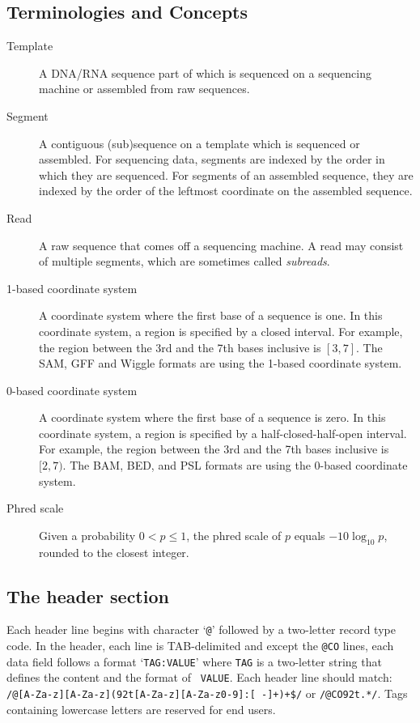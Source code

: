 \documentclass[10pt]{article}
\begin{document}
\pagebreak

\subsection{Terminologies and Concepts}

\begin{description}
\item[Template] A DNA/RNA sequence part of which is sequenced on a
  sequencing machine or assembled from raw sequences.
\item[Segment] A contiguous (sub)sequence on a template which is
  sequenced or assembled. For sequencing data, segments are indexed by
  the order in which they are sequenced. For segments of an assembled
  sequence, they are indexed by the order of the leftmost coordinate on
  the assembled sequence.
\item[Read] A raw sequence that comes off a sequencing machine. A read
  may consist of multiple segments, which are sometimes called \emph{subreads}.
\item[1-based coordinate system] A coordinate system where the first
  base of a sequence is one. In this coordinate system, a region is
  specified by a closed interval. For example, the region between the
  3rd and the 7th bases inclusive is $[3,7]$. The SAM, GFF and Wiggle
  formats are using the 1-based coordinate system.
\item[0-based coordinate system] A coordinate system where the first
  base of a sequence is zero. In this coordinate system, a region is
  specified by a half-closed-half-open interval. For example, the region
  between the 3rd and the 7th bases inclusive is $[2,7)$. The BAM, BED,
  and PSL formats are using the 0-based coordinate system.
\item[Phred scale] Given a probability $0<p\le 1$, the phred scale of $p$
  equals $-10\log_{10}p$, rounded to the closest integer.
\end{description}

\subsection{The header section}
Each header line begins with character `{\tt @}' followed by a
two-letter record type code. In the header, each line is TAB-delimited
and except the {\tt @CO} lines, each data field follows a format `{\tt TAG:VALUE}' where {\tt TAG}
is a two-letter string that defines the content and the format of {\tt
  VALUE}. Each header line should match: {\tt
  /@[A-Za-z][A-Za-z](\char92t[A-Za-z][A-Za-z0-9]:[
  -]+)+\$/} or {\tt /@CO\char92t.*/}. Tags containing lowercase letters are reserved for
end users.
\end{document}
